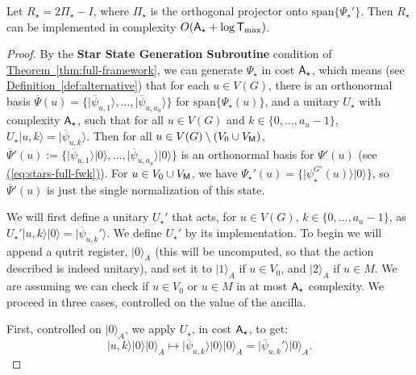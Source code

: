 \documentclass{theoretics}
\newcommand{\eq}[1]{\hyperref[eq:#1]{(\ref*{eq:#1})}}
\newcommand{\thm}[1]{\hyperref[thm:#1]{Theorem~\ref*{thm:#1}}}
\newcommand{\defin}[1]{\hyperref[def:#1]{Definition~\ref*{def:#1}}}
\def\ket#1{{\lvert}#1\rangle}
\renewcommand{\>}{\rangle}
\newcommand{\<}{\langle}
\renewcommand{\(}{\left(}
\renewcommand{\)}{\right)}
\begin{document}
\begin{claim}\label{clm:fwk-star-unitary}
Let $R_\star =2\Pi_{\star}-I$, where $\Pi_\star$ is the orthogonal projector onto $\mathrm{span}\{\Psi_\star'\}$. Then $R_\star$ can be implemented in complexity $O({\sf A}_\star+\log{\sf T}_{\max})$. 
\end{claim}
\begin{proof}
By the \textbf{Star State Generation Subroutine} condition of \thm{full-framework}, we can generate $\Psi_\star$ in cost ${\sf A}_\star$, which means (see \defin{alternative}) that for each  $u\in V(G)$, there is an orthonormal basis $\overline{\Psi}(u)=\{\ket{\overline{\psi}_{u,1}},\dots,\ket{\overline{\psi}_{u,a_u}}\}$ for $\mathrm{span}\{\Psi_\star(u)\}$, and a unitary $U_\star$ with complexity ${\sf A}_\star$, such that for all $u\in V(G)$ and $k\in \{0,\dots,a_u-1\}$,
$U_\star\ket{u,k}=\ket{\overline{\psi}_{u,k}}.$
Then for all $u\in V(G)\setminus (V_0\cup V_{\sf M})$, $\overline{\Psi}'(u):=\{\ket{\overline{\psi}_{u,1}}\ket{0},\dots,\ket{\overline{\psi}_{u,a_u}}\ket{0}\}$ is an orthonormal basis for $\Psi'(u)$ (see \eq{stars-full-fwk}).
For $u\in V_0\cup V_{\sf M}$, we have $\Psi_{\star}'(u)=\{\ket{\psi_\star^{G'}(u)}\ket{0}\}$, so $\overline{\Psi}'(u)$ is just the single normalization of this state. 

We will first define a unitary $U_\star'$ that acts, for $u\in V(G)$, $k\in\{0,\dots,a_u-1\}$, as
$
U_\star'\ket{u,k}\ket{0}=\ket{\overline{\psi}_{u,k}'}.
$
We define $U_\star'$ by its implementation. To begin we will append a qutrit register, $\ket{0}_A$ (this will be uncomputed, so that the action described is indeed unitary), and set it to $\ket{1}_A$ if $u\in V_0$, and $\ket{2}_A$ if $u\in M$. We are assuming we can check if $u\in V_0$ or $u\in M$ in at most ${\sf A}_{\star}$ complexity. We proceed in three cases, controlled on the value of the ancilla.

\noindent First, controlled on $\ket{0}_A$, we apply $U_{\star}$, in cost ${\sf A}_\star$, to get:
$$\ket{u,k}\ket{0}\ket{0}_A\mapsto \ket{\overline{\psi}_{u,k}}\ket{0}\ket{0}_A
= \ket{\overline{\psi}_{u,k}'}\ket{0}_A.$$


\end{proof}
\end{document}

